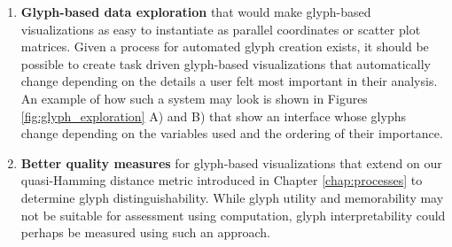 \begin{enumerate}
\item \textbf{Glyph-based data exploration} that would make glyph-based visualizations as easy to instantiate as parallel coordinates or scatter plot matrices.
Given a process for automated glyph creation exists, it should be possible to create task driven glyph-based visualizations that automatically change depending on the details a user felt most important in their analysis.
An example of how such a system may look is shown in Figures \ref{fig:glyph_exploration} A) and B) that show an interface whose glyphs change depending on the variables used and the ordering of their importance.

\item \textbf{Better quality measures} for glyph-based visualizations that extend on our quasi-Hamming distance metric introduced in Chapter \ref{chap:processes} to determine glyph distinguishability.
While glyph utility and memorability may not be suitable for assessment using computation, glyph interpretability could perhaps be measured using such an approach.
\end{enumerate}
